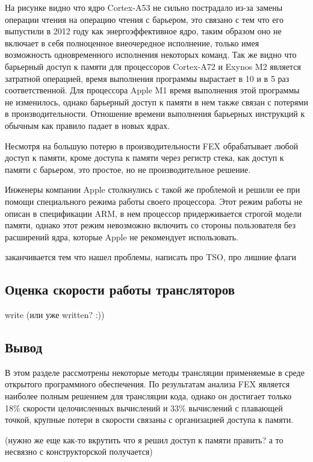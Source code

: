 На рисунке видно что ядро Cortex-A53 не сильно пострадало из-за замены операции чтения на операцию чтения с барьером, это связано с тем что его выпустили в 2012 году как энергоэффективное ядро, таким образом оно не включает в себя полноценное внеочередное исполнение, только имея возможность одновременного исполнения некоторых команд. Так же видно что барьерный доступ к памяти для процессоров Cortex-A72 и Exynos M2 является затратной операцией, время выполнения программы вырастает в 10 и в 5 раз соответственной. Для процессора Apple M1 время выполнения этой программы не изменилось, однако барьерный доступ к памяти в нем также связан с потерями в производительности. Отношение времени выполнения барьерных инструкций к обычным как правило падает в новых ядрах.

Несмотря на большую потерю в производительности FEX обрабатывает любой доступ к памяти, кроме доступа к памяти через регистр стека, как доступ к памяти с барьером, это простое, но не производительное решение.

Инженеры компании Apple столкнулись с такой же проблемой и решили ее при помощи специального режима работы своего процессора. Этот режим работы не описан в спецификации ARM, в нем процессор придерживается строгой модели памяти, однако этот режим невозможно включить со стороны пользователя без расширений ядра, которые Apple не рекомендует использовать.

заканчивается тем что нашел проблемы, написать про TSO, про лишние флаги 

\subsection{Оценка скорости работы трансляторов}

write (или уже written? :))

\subsection{Вывод}

В этом разделе рассмотрены некоторые методы трансляции применяемые в среде открытого программного обеспечения. По результатам анализа FEX является наиболее полным решением для трансляции кода, однако он достигает только 18\% скорости целочисленных вычислений и 33\% вычислений с плавающей точкой, крупные потери в скорости связаны с организацией доступа к памяти.

(нужно же еще как-то вкрутить что я решил доступ к памяти править? а то несвязно с конструкторской получается)

